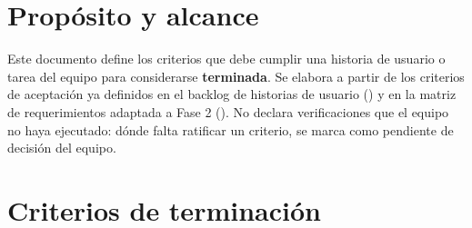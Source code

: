 \documentclass[11pt,a4paper]{article}
\begin{document}
\maketitlecapstone

\section{Propósito y alcance}

Este documento define los criterios que debe cumplir una historia de usuario o
tarea del equipo para considerarse \textbf{terminada}. Se elabora a partir de
los criterios de aceptación ya definidos en el backlog de historias de usuario
() y en la matriz de
requerimientos adaptada a Fase 2
(). No declara
verificaciones que el equipo no haya ejecutado: dónde falta ratificar un
criterio, se marca como pendiente de decisión del equipo.

\section{Criterios de terminación}
\end{document}
